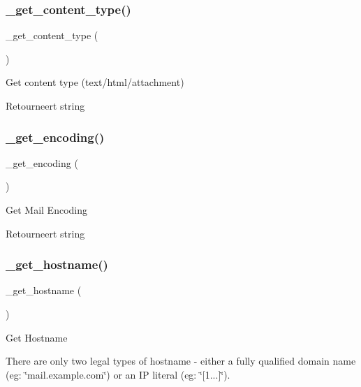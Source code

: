 \subsubsection{\texorpdfstring{\_get\_content\_type()}{\_get\_content\_type()}}
{\footnotesize\ttfamily \+\_\+get\+\_\+content\+\_\+type (\begin{DoxyParamCaption}{ }\end{DoxyParamCaption})\hspace{0.3cm}{\ttfamily [protected]}}

Get content type (text/html/attachment)

\begin{DoxyReturn}{Retourneert}
string 
\end{DoxyReturn}
\mbox{\label{class_c_i___email_ab7a90b9198c0384a2a330728f2c78ebd}} 
\subsubsection{\texorpdfstring{\_get\_encoding()}{\_get\_encoding()}}
{\footnotesize\ttfamily \+\_\+get\+\_\+encoding (\begin{DoxyParamCaption}{ }\end{DoxyParamCaption})\hspace{0.3cm}{\ttfamily [protected]}}

Get Mail Encoding

\begin{DoxyReturn}{Retourneert}
string 
\end{DoxyReturn}
\mbox{\label{class_c_i___email_ad2d333b7bb9f6c25400714dd8931fe11}} 
\subsubsection{\texorpdfstring{\_get\_hostname()}{\_get\_hostname()}}
{\footnotesize\ttfamily \+\_\+get\+\_\+hostname (\begin{DoxyParamCaption}{ }\end{DoxyParamCaption})\hspace{0.3cm}{\ttfamily [protected]}}

Get Hostname

There are only two legal types of hostname -\/ either a fully qualified domain name (eg\+: \char`\"{}mail.\+example.\+com\char`\"{}) or an IP literal (eg\+: \char`\"{}\mbox{[}1...\mbox{]}\char`\"{}).


